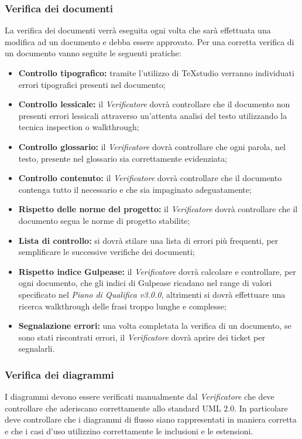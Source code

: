 \subsubsection{Verifica dei documenti}
La verifica dei documenti verrà eseguita ogni volta che sarà effettuata una modifica ad un documento e debba essere approvato.
Per una corretta verifica di un documento vanno seguite le seguenti pratiche:

\begin{itemize}
	\item \textbf{Controllo tipografico: }tramite l'utilizzo di TeXstudio verranno individuati errori tipografici presenti nel documento;
	\item \textbf{Controllo lessicale: }il \textit{Verificatore} dovrà controllare che il documento non presenti errori lessicali attraverso un'attenta analisi del testo utilizzando la tecnica \gls{inspection} o \gls{walkthrough};
	\item \textbf{Controllo glossario: }il \textit{Verificatore} dovrà controllare che ogni parola, nel testo, presente nel glossario sia correttamente evidenziata;
	\item \textbf{Controllo contenuto: }il \textit{Verificatore} dovrà controllare che il documento contenga tutto il necessario e che sia impaginato adeguatamente;
	\item \textbf{Rispetto delle norme del progetto: }il \textit{Verificatore} dovrà controllare che il documento segua le norme di progetto stabilite;
	\item \textbf{Lista di controllo: }si dovrà stilare una lista di errori più frequenti, per semplificare le successive verifiche dei documenti;
	\item \textbf{Rispetto \gls{indice Gulpease}: }il \textit{Verificatore} dovrà calcolare e controllare, per ogni documento, che gli \gls{indici di Gulpease} ricadano nel range di valori specificato nel \textit{Piano di Qualifica v3.0.0}, altrimenti si dovrà effettuare una ricerca \gls{walkthrough} delle frasi troppo lunghe e complesse;
	\item \textbf{Segnalazione errori: }una volta completata la verifica di un documento, se sono stati riscontrati errori, il \textit{Verificatore} dovrà aprire dei \gls{ticket} per segnalarli.
\end{itemize}
	
\subsubsection{Verifica dei diagrammi}
I diagrammi devono essere verificati manualmente dal \textit{Verificatore} che deve controllare che aderiscano correttamente allo standard \gls{UML} 2.0.
In particolare deve controllare che i diagrammi di flusso siano rappresentati in maniera corretta e che i \gls{casi d'uso} utilizzino correttamente le inclusioni e le estensioni.

